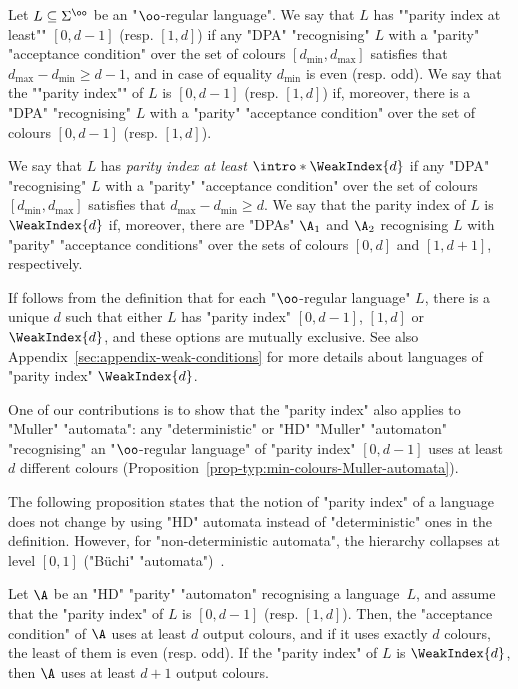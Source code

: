 \documentclass[10pt,a4paper]{amsart}
\renewcommand{\SS}{\Sigma}
\begin{document}
\begin{definition}\label{def:parity_index_language}
	Let $L\subseteq \SS^\oo$ be an "$\oo$-regular language". 
	\AP We say that $L$ has ""parity index at least"" $[0, d-1]$ (resp. $[1, d]$) if any "DPA" "recognising" $L$ with a "parity" "acceptance condition" over the set of colours $[d_{\min}, d_{\max}]$ satisfies that $d_{\max} - d_{\min} \geq d-1$, and in case of equality $d_{\min}$ is even (resp. odd).
	We say that the ""parity index"" of $L$ is $[0, d-1]$ (resp. $[1, d]$) if, moreover, there is a "DPA" "recognising" $L$ with a "parity" "acceptance condition" over the set of colours $[0,d-1]$ (resp. $[1,d]$). 
	
	\AP We say that $L$ has \emph{parity index at least} $\intro*\WeakIndex{d}$ if any "DPA" "recognising" $L$ with a "parity" "acceptance condition" over the set of colours $[d_{\min}, d_{\max}]$ satisfies that $d_{\max} - d_{\min} \geq d$. We say that the parity index of $L$ is $\WeakIndex{d}$ if, moreover, there are "DPAs" $\A_1$ and $\A_2$ recognising $L$ with "parity" "acceptance conditions" over the sets of colours $[0,d]$ and $[1,d+1]$, respectively.  
	
\end{definition}

If follows from the definition that for each "$\oo$-regular language" $L$, there is a unique $d$ such that either $L$ has "parity index" $[0,d-1]$, $[1,d]$ or $\WeakIndex{d}$, and these options are mutually exclusive. See also Appendix~\ref{sec:appendix-weak-conditions} for more details about languages of "parity index" $\WeakIndex{d}$.

One of our contributions is to show that the "parity index" also applies to "Muller" "automata": any "deterministic" or "HD" "Muller" "automaton" "recognising" an "$\oo$-regular language" of "parity index" $[0, d-1]$ uses at least $d$ different colours (Proposition~\ref{prop-typ:min-colours-Muller-automata}).

The following proposition states that the notion of "parity index" of a language does not change by using "HD" automata instead of "deterministic" ones in the definition.
However, for "non-deterministic automata", the hierarchy collapses at level $[0,1]$ ("Büchi" "automata")~\cite{McNaughton1966Testing}.


\begin{proposition}\label{prop-prelim:parity_index-HDAutomata}
	Let $\A$ be an "HD" "parity" "automaton" recognising a language~$L$, and assume that the "parity index" of $L$ is $[0,d-1]$ (resp. $[1,d]$). Then, the "acceptance condition" of $\A$ uses at least $d$ output colours, and if it uses exactly $d$ colours, the least of them is even (resp. odd). If the "parity index" of $L$ is $\WeakIndex{d}$, then $\A$ uses at least $d+1$ output colours.
\end{proposition}
\end{document}
